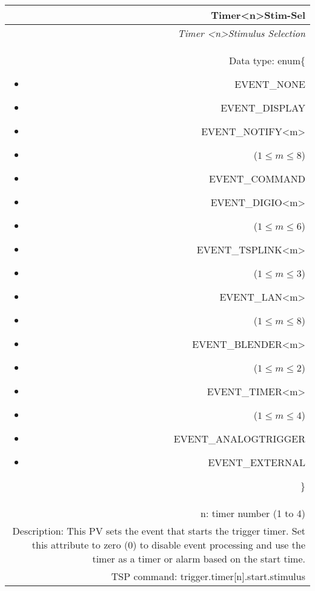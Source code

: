 \documentclass[openany]{article}
\begin{document}
		\begin{tabular}{N}
			\hline
			\bfseries Timer{\textless n\textgreater}Stim-Sel\label{pv:timerstim-sel} \\ \hline
			\emph{Timer \textless n\textgreater Stimulus Selection} \\
			Data type: enum\{\begin{itemize}[noitemsep]
				\small
				\item[] EVENT\_NONE
				\item[] EVENT\_DISPLAY
				\item[] EVENT\_NOTIFY\textless m\textgreater
				\item[] ($1\leq m\leq 8$)
				\item[] EVENT\_COMMAND
				\item[] EVENT\_DIGIO\textless m\textgreater
				\item[] ($1\leq m\leq 6$)
				\item[] EVENT\_TSPLINK\textless m\textgreater
				\item[] ($1\leq m\leq 3$)
				\item[] EVENT\_LAN\textless m\textgreater
				\item[] ($1\leq m\leq 8$)
				\item[] EVENT\_BLENDER\textless m\textgreater 
				\item[] ($1\leq m\leq 2$)
				\item[] EVENT\_TIMER\textless m\textgreater
				\item[] ($1\leq m\leq 4$)
				\item[] EVENT\_ANALOGTRIGGER
				\item[] EVENT\_EXTERNAL
			\end{itemize}\} \\
			n: timer number (1 to 4) \\
			Description: This PV sets the event that starts the trigger timer. Set this attribute to zero (0) to disable event processing and use the timer as a timer or alarm based on the start time. \\
			TSP command: trigger.timer[n].start.stimulus
		\end{tabular}
\end{document}
